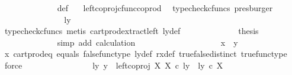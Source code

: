 \begin{isabellebody}
\ \ \ \ \ \ \ \ \ \ \ \ \isamarkupfalse%
\ {\isasymrho}{\isacharunderscore}{\kern0pt}def\ \ \isamarkupfalse%
\ left{\isacharunderscore}{\kern0pt}coproj{\isacharunderscore}{\kern0pt}cfunc{\isacharunderscore}{\kern0pt}coprod\ \isamarkupfalse%
\ {\isacharparenleft}{\kern0pt}typecheck{\isacharunderscore}{\kern0pt}cfuncs{\isacharcomma}{\kern0pt}\ presburger{\isacharparenright}{\kern0pt}\isanewline
\ \ \ \ \ \ \ \ \ \ \isamarkupfalse%
\ \isamarkupfalse%
\ {\isachardoublequoteopen}{\isachardot}{\kern0pt}{\isachardot}{\kern0pt}{\isachardot}{\kern0pt}\ {\isacharequal}{\kern0pt}\ {\isasymlangle}ly{\isacharcomma}{\kern0pt}\ {\isasymt}{\isasymrangle}{\isachardoublequoteclose}\isanewline
\ \ \ \ \ \ \ \ \ \ \ \ \isamarkupfalse%
\ {\isacharparenleft}{\kern0pt}typecheck{\isacharunderscore}{\kern0pt}cfuncs{\isacharcomma}{\kern0pt}\ metis\ cart{\isacharunderscore}{\kern0pt}prod{\isacharunderscore}{\kern0pt}extract{\isacharunderscore}{\kern0pt}left\ ly{\isacharunderscore}{\kern0pt}def{\isacharparenright}{\kern0pt}\isanewline
\ \ \ \ \ \ \ \ \ \ \isamarkupfalse%
\ \isamarkupfalse%
\ {\isacharquery}{\kern0pt}thesis\isanewline
\ \ \ \ \ \ \ \ \ \ \ \ \isamarkupfalse%
\ {\isacharparenleft}{\kern0pt}simp\ add{\isacharcolon}{\kern0pt}\ calculation{\isacharparenright}{\kern0pt}\isanewline
\ \ \ \ \ \ \ \ \isamarkupfalse%
\isanewline
\ \ \ \ \ \ \ \ \isamarkupfalse%
\ \isamarkupfalse%
\ {\isachardoublequoteopen}x\ {\isacharequal}{\kern0pt}\ y{\isachardoublequoteclose}\isanewline
\ \ \ \ \ \ \ \ \ \ \isamarkupfalse%
\ {\isasymrho}x\ cart{\isacharunderscore}{\kern0pt}prod{\isacharunderscore}{\kern0pt}eq{}\ equals\ false{\isacharunderscore}{\kern0pt}func{\isacharunderscore}{\kern0pt}type\ ly{\isacharunderscore}{\kern0pt}def\ rx{\isacharunderscore}{\kern0pt}def\ true{\isacharunderscore}{\kern0pt}false{\isacharunderscore}{\kern0pt}distinct\ true{\isacharunderscore}{\kern0pt}func{\isacharunderscore}{\kern0pt}type\ \isamarkupfalse%
\ force\isanewline
\ \ \ \ \ \ \isamarkupfalse%
\isanewline
\ \ \ \ \ \ \ \ \isamarkupfalse%
\ {\isachardoublequoteopen}{\isasymnexists}ly{\isachardot}{\kern0pt}\ y\ {\isacharequal}{\kern0pt}\ left{\isacharunderscore}{\kern0pt}coproj\ X\ X\ {\isasymcirc}\isactrlsub c\ ly\ {\isasymand}\ ly\ {\isasymin}\isactrlsub c\ X{\isachardoublequoteclose}\isanewline
\ \ \ \ \ \ \ \ \isamarkupfalse%

\end{isabellebody}
